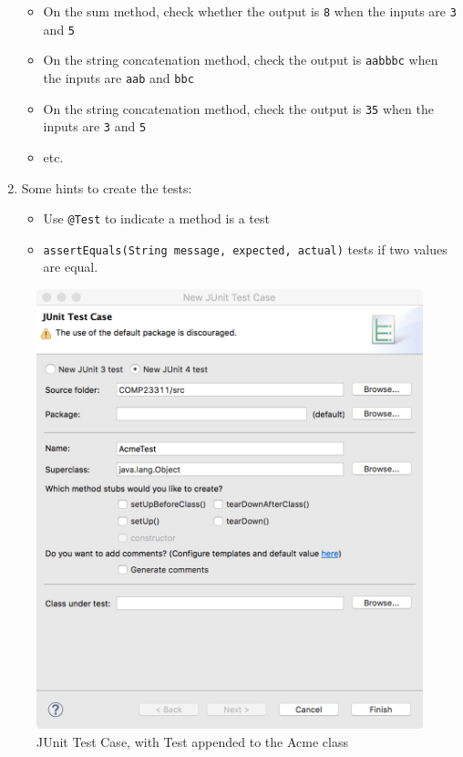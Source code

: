 \documentclass[
]{book}
\providecommand{\tightlist}{%
  \setlength{\itemsep}{0pt}\setlength{\parskip}{0pt}}
\begin{document}
\begin{enumerate}
  \begin{itemize}
  \tightlist
  \item
    On the sum method, check whether the output is \texttt{8} when the inputs are \texttt{3} and \texttt{5}
  \item
    On the string concatenation method, check the output is \texttt{aabbbc} when the inputs are \texttt{aab} and \texttt{bbc}
  \item
    On the string concatenation method, check the output is \texttt{35} when the inputs are \texttt{3} and \texttt{5}
  \item
    etc.
  \end{itemize}
\item
  Some hints to create the tests:

  \begin{itemize}
  \tightlist
  \item
    Use \texttt{@Test} to indicate a method is a test
  \item
    \texttt{assertEquals(String\ message,\ expected,\ actual)} tests if two values are equal.
  \end{itemize}
\end{enumerate}

\begin{figure}

{\centering \includegraphics[width=1\linewidth]{images/junit-name} 

}

\caption{JUnit Test Case, with Test appended to the Acme class}\label{fig:junit-name-fig}
\end{figure}
\end{document}
